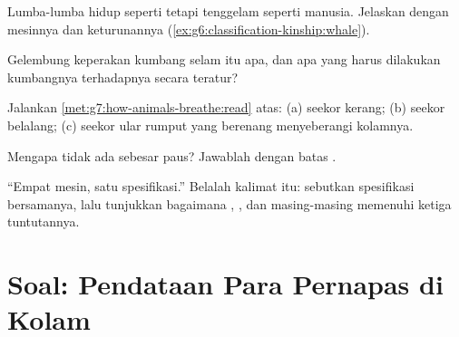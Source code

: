 \begin{exercise}[$\star\star$]\label{exo:g7:how-animals-breathe:8}
Lumba-lumba hidup seperti  tetapi tenggelam seperti manusia.
Jelaskan dengan mesinnya dan keturunannya
(\cref{ex:g6:classification-kinship:whale}).
\end{exercise}

\begin{exercise}[$\star\star$]\label{exo:g7:how-animals-breathe:9}
Gelembung keperakan kumbang selam itu apa, dan apa yang harus
dilakukan kumbangnya terhadapnya secara teratur?
\end{exercise}

\begin{exercise}[$\star\star$]\label{exo:g7:how-animals-breathe:10}
Jalankan \cref{met:g7:how-animals-breathe:read} atas: (a) seekor
kerang; (b) seekor belalang; (c) seekor ular rumput yang berenang
menyeberangi kolamnya.
\end{exercise}

\begin{exercise}[$\star\star$]\label{exo:g7:how-animals-breathe:11}
Mengapa tidak ada  sebesar paus? Jawablah dengan batas
.
\end{exercise}

\begin{exercise}[$\star\star\star$]\label{exo:g7:how-animals-breathe:12}
``Empat mesin, satu spesifikasi.'' Belalah kalimat itu: sebutkan
spesifikasi bersamanya, lalu tunjukkan bagaimana , ,
 dan  masing-masing memenuhi ketiga tuntutannya.
\end{exercise}

\section{Soal: Pendataan Para Pernapas di Kolam}

